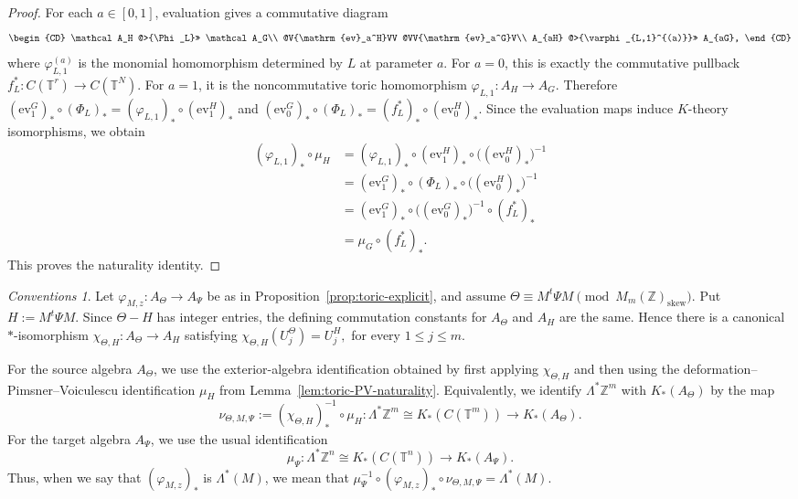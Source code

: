 \documentclass[11pt]{amsart}
\theoremstyle{definition}
\theoremstyle{remark}
\newtheorem{conventions}[theorem]{Conventions}
\newcommand{\T}{\mathbb{T}}
\newcommand{\Z}{\mathbb{Z}}
\newcommand{\ev}{\mathrm{ev}}
\begin{document}
\begin{proof}
For each $a\in[0,1]$, evaluation gives a commutative diagram
\[
\begin{CD}
\mathcal A_H @>{\Phi_L}>> \mathcal A_G\\
@V{\ev_a^H}VV @VV{\ev_a^G}V\\
A_{aH} @>{\varphi_{L,1}^{(a)}}>> A_{aG},
\end{CD}
\]
where $\varphi_{L,1}^{(a)}$ is the monomial homomorphism determined by $L$ at
parameter $a$. For $a=0$, this is exactly the commutative pullback $f_L^*\colon C(\T^r)\to C(\T^N).$
For $a=1$, it is the noncommutative toric homomorphism
$\varphi_{L,1}\colon A_H\to A_G.$
Therefore $(\ev_1^G)_*\circ(\Phi_L)_*=(\varphi_{L,1})_*\circ(\ev_1^H)_*$
and $(\ev_0^G)_*\circ(\Phi_L)_*=(f_L^*)_*\circ(\ev_0^H)_*.$
Since the evaluation maps induce $K$-theory isomorphisms, we obtain
\[
\begin{aligned}
(\varphi_{L,1})_*\circ\mu_H
&=
(\varphi_{L,1})_*
\circ
(\ev_1^H)_*
\circ
\bigl((\ev_0^H)_*\bigr)^{-1}
\\
&=
(\ev_1^G)_*
\circ
(\Phi_L)_*
\circ
\bigl((\ev_0^H)_*\bigr)^{-1}
\\
&=
(\ev_1^G)_*
\circ
\bigl((\ev_0^G)_*\bigr)^{-1}
\circ
(f_L^*)_*
\\
&=
\mu_G\circ(f_L^*)_*.
\end{aligned}
\]
This proves the naturality identity. \end{proof}

\begin{conventions}\label{conv:toric-K-identification}
Let $\varphi_{M,z}\colon A_\Theta\to A_\Psi$
be as in Proposition~\ref{prop:toric-explicit}, and assume $\Theta\equiv M^t\Psi M
\pmod{M_m(\Z)_{\mathrm{skew}}}.$
Put $H:=M^t\Psi M.$ Since $\Theta-H$ has integer entries, the defining commutation constants for
$A_\Theta$ and $A_H$ are the same. Hence there is a canonical
$*$-isomorphism $\chi_{\Theta,H}\colon A_\Theta\longrightarrow A_H$ satisfying 
$\chi_{\Theta,H}(U_j^\Theta)=U_j^H,$ for every $1\leq j\leq m.$

For the source algebra $A_\Theta$, we use the exterior-algebra identification
obtained by first applying $\chi_{\Theta,H}$ and then using the
deformation--Pimsner--Voiculescu identification $\mu_H$ from
Lemma~\ref{lem:toric-PV-naturality}. Equivalently, we identify
$\Lambda^*\Z^m$ with $K_*(A_\Theta)$ by the map
\[
\nu_{\Theta,M,\Psi}
:=
(\chi_{\Theta,H})_*^{-1}\circ\mu_H
\colon
\Lambda^*\Z^m\cong K_*(C(\T^m))
\longrightarrow K_*(A_\Theta).
\]
For the target algebra $A_\Psi$, we use the usual identification
\[
\mu_\Psi\colon \Lambda^*\Z^n\cong K_*(C(\T^n))
\longrightarrow K_*(A_\Psi).
\]
Thus, when we say that $(\varphi_{M,z})_*$ is $\Lambda^*(M)$, we mean that $\mu_\Psi^{-1}\circ(\varphi_{M,z})_*\circ\nu_{\Theta,M,\Psi}=\Lambda^*(M).$
\end{conventions}
\end{document}
